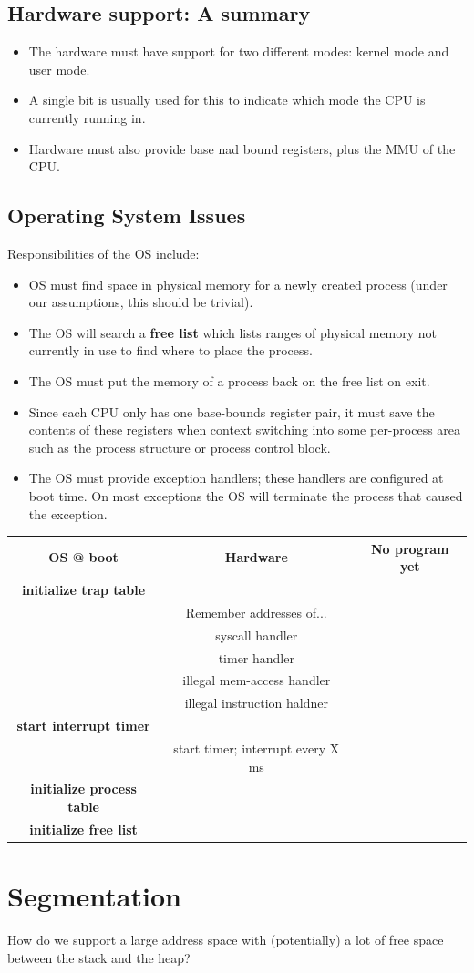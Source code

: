 \documentclass[11pt, a4paper]{article}
\theoremstyle{definition}
\theoremstyle{remark}
\newcommand{\chap}[2]{%
  \renewcommand{\thesection}{\arabic{section}}%
  \renewcommand{\theHsection}{chap.\arabic{section}}%
  \setcounter{section}{#1}\addtocounter{section}{-1}%
  \section{#2}}
\begin{document}
\subsection{Hardware support: A summary} 
\begin{itemize}
  \item The hardware must have support for two different modes: kernel mode and user mode. 
  \item A single bit is usually used for this to indicate which mode the CPU is currently running in. 
  \item Hardware must also provide base nad bound registers, plus the MMU of the CPU.
\end{itemize}
\subsection{Operating System Issues}
Responsibilities of the OS include:
\begin{itemize}
  \item OS must find space in physical memory for a newly created process (under our assumptions, this should be trivial).
  \item The OS will search a \textbf{free list} which lists ranges of physical memory not currently in use to find where to place the process. 
  \item The OS must put the memory of a process back on the free list on exit. 
  \item Since each CPU only has one base-bounds register pair, it must save the contents of these registers when context switching into some per-process area such as the process structure or process control block.
  \item The OS must provide exception handlers; these handlers are configured at boot time. On most exceptions the OS will terminate the process that caused the exception.
\end{itemize}
\begin{center}
\begin{tabular}{c c c}
\textbf{OS @ boot} & \textbf{Hardware} & \textbf{No program yet} \\ 
\hline 
\textbf{initialize trap table} & & \\
& Remember addresses of... & \\
& syscall handler & \\ 
& timer handler & \\ 
& illegal mem-access handler & \\ 
& illegal instruction haldner & \\ 
\textbf{start interrupt timer} & &\\
& start timer; interrupt every X ms & \\ 
\textbf{initialize process table} & & \\
\textbf{initialize free list} & & \\
\end{tabular}
\end{center}
\chap{16}{Segmentation}
How do we support a large address space with (potentially) a lot of free space between the stack and the heap?
\end{document}

